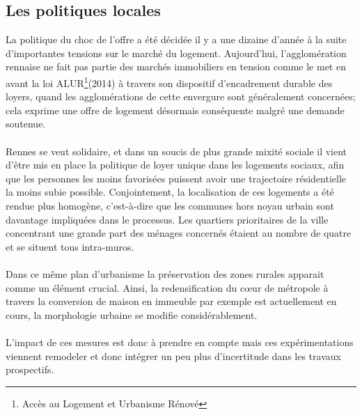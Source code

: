\documentclass{bredele}
\begin{document}
\subsection{Les politiques locales}
La politique du choc de l’offre a été décidée il y a une dizaine d’année à la suite d’importantes tensions sur le marché du logement. Aujourd’hui, l’agglomération rennaise ne fait pas partie des marchés immobiliers en tension comme le met en avant la loi ALUR\footnote{Accès au Logement et Urbanisme Rénové}(2014) à travers son dispositif d'encadrement durable des loyers, quand les agglomérations de cette envergure sont généralement concernées; cela exprime une offre de logement désormais conséquente malgré une demande soutenue.
\\\\Rennes se veut solidaire, et dans un soucis de plus grande mixité sociale il vient d’être mis en place la politique de loyer unique dans les logements sociaux, afin que les personnes les moins favorisées puissent avoir une trajectoire résidentielle la moins subie possible. Conjointement, la localisation de ces logements a été rendue plus homogène, c'est-à-dire que les communes hors noyau urbain sont davantage impliquées dans le processus. Les quartiers prioritaires de la ville concentrant une grande part des ménages concernés étaient au nombre de quatre et se situent tous intra-muros.
\\\\Dans ce même plan d’urbanisme la préservation des zones rurales apparait comme un élément crucial. Ainsi, la redensification du cœur de métropole à travers la conversion de maison en immeuble par exemple est actuellement en cours, la morphologie urbaine se modifie considérablement.
\\\\L’impact de ces mesures est donc à prendre en compte mais ces expérimentations viennent remodeler et donc intégrer un peu plus d’incertitude dans les travaux prospectifs.
\end{document}
